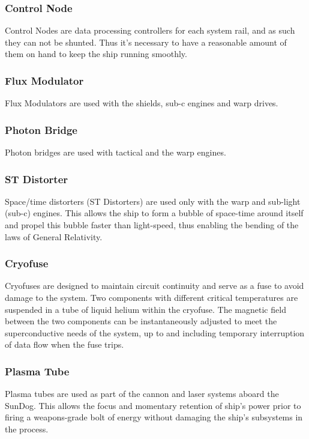 \subsubsection{Control Node}
Control Nodes are data processing controllers for each system rail, and as such 
they can not be shunted. Thus it's necessary to have a reasonable amount of 
them on hand to keep the ship running smoothly.  

\subsubsection{Flux Modulator}
Flux Modulators are used with the shields, sub-c engines and warp drives.

\subsubsection{Photon Bridge}
Photon bridges are used with tactical and the warp engines.

\subsubsection{ST Distorter}
Space/time distorters (ST Distorters) are used only with the warp and
sub-light (sub-c) engines. This allows the ship to form a bubble of space-time around itself and propel this bubble faster than light-speed, thus enabling the bending of the laws of General Relativity.

\subsubsection{Cryofuse}

Cryofuses are designed to maintain circuit continuity and serve as a fuse to avoid 
damage to the system. Two components with different critical temperatures are suspended 
in a tube of liquid helium within the cryofuse. The magnetic field between the two 
components can be instantaneously adjusted to meet the superconductive needs of the 
system, up to and including temporary interruption of data flow when the fuse trips.  

\subsubsection{Plasma Tube}

Plasma tubes are used as part of the cannon and laser systems aboard the
SunDog. This allows the focus and momentary retention of ship's power prior to firing a 
weapons-grade bolt of energy without damaging the ship's subsystems in the process. 

